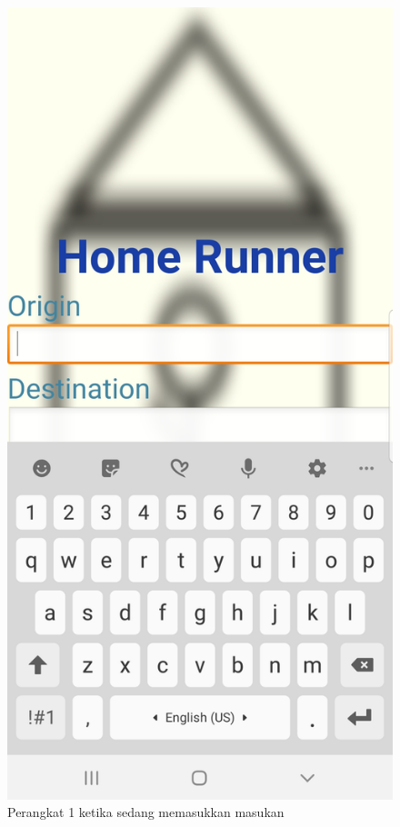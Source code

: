 \begin{figure}[!htb]
  \includegraphics[width=\linewidth]{Gambar/samsung-note8-screenshot.png}
  \caption{Perangkat 1 ketika sedang memasukkan masukan}\label{fig:note8-screenshot}

\end{figure}
